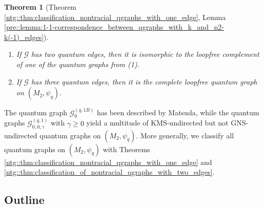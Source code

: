 \documentclass{amsart}
\newtheorem{thm}{Theorem}[section]
\begin{document}
\begin{thm}[Theorem \ref{ntg::thm:classification_nontracial_qgraphs_with_one_edge}, Lemma \ref{pre::lemma:1-1-correspondence_between_qgraphs_with_k_and_n2-k(-1)_edges}]
\begin{enumerate}
\begin{enumerate}
\begin{align*}
\begin{pmatrix}
                    q^{\frac{3}{2}}\beta_- \overline{\gamma} & \beta_+ \beta_-                          & - q^{-2} |\gamma|^2   & -q^{\frac{1}{2}}\beta_+ \gamma   \\
                    q^{-1}\beta_-^2         & - q^{-\frac{1}{2}}\beta_- \overline{\gamma}            & -q^{-\frac{1}{2}} \beta_- \gamma              & |\gamma|^2        
                \end{pmatrix},
            \end{align*}
            where $\beta_+ = 1+\beta$, $\beta_- = 1-\beta$ and
            \begin{align*}
                c = \frac{1}{1+q^2} \left( \left(q^{-2}+1\right)|\gamma|^2 + 2q\left(1+\beta^2\right)\right).
            \end{align*}
            This quantum graph is not GNS-undirected, and it is KMS-undirected if and only if $\beta = 0$ (and $\gamma \geq 0$).
        \end{enumerate}
        \item If $\mathcal{G}$ has two quantum edges, then it is isomorphic to the loopfree complement of one of the quantum graphs from (1).
        \item If $\mathcal{G}$ has three quantum edges, then it is the complete loopfree quantum graph on $(M_2, \psi_q)$.
    \end{enumerate}
\end{thm}

The quantum graph $\mathcal{G}_0^{(q,1B)}$ has been described by Matsuda, while the quantum graphs $\mathcal{G}_{0, 0, \gamma}^{(q,1)}$ with $\gamma \geq 0$ yield a multitude of KMS-undirected but not GNS-undirected quantum graphs on $(M_2, \psi_q)$. More generally, we classify all quantum graphs on $(M_2, \psi_q)$ with Theorems \ref{ntg::thm:classification_nontracial_qgraphs_with_one_edge} and \ref{ntg::thm:classification_of_nontracial_qgraphs_with_two_edges}.

\subsection{Outline} 
\end{document}
